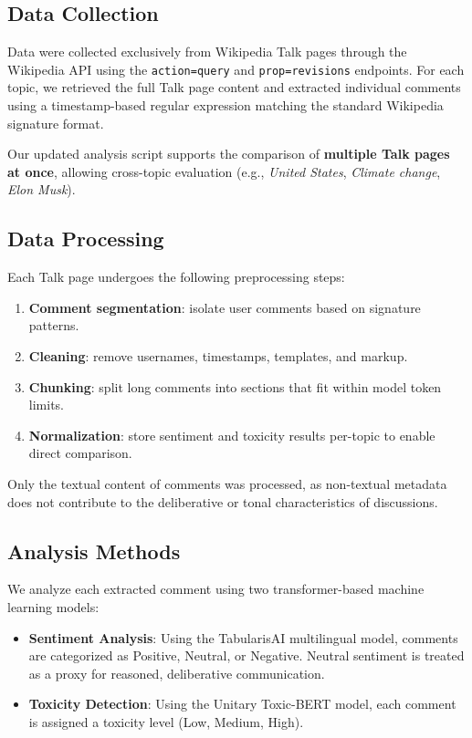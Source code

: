 \subsection{Data Collection}

Data were collected exclusively from Wikipedia Talk pages through the Wikipedia API using the 
\texttt{action=query} and \texttt{prop=revisions} endpoints. For each topic, we retrieved the 
full Talk page content and extracted individual comments using a timestamp-based regular 
expression matching the standard Wikipedia signature format.

Our updated analysis script supports the comparison of \textbf{multiple Talk pages at once}, 
allowing cross-topic evaluation (e.g., \textit{United States}, \textit{Climate change}, 
\textit{Elon Musk}).

\subsection{Data Processing}

Each Talk page undergoes the following preprocessing steps:

\begin{enumerate}
    \item \textbf{Comment segmentation}: isolate user comments based on signature patterns.
    \item \textbf{Cleaning}: remove usernames, timestamps, templates, and markup.
    \item \textbf{Chunking}: split long comments into sections that fit within model token limits.
    \item \textbf{Normalization}: store sentiment and toxicity results per-topic to enable direct comparison.
\end{enumerate}

Only the textual content of comments was processed, as non-textual metadata does not contribute 
to the deliberative or tonal characteristics of discussions.

\subsection{Analysis Methods}

We analyze each extracted comment using two transformer-based machine learning models:

\begin{itemize}
    \item \textbf{Sentiment Analysis}: Using the TabularisAI multilingual model, comments are categorized 
    as Positive, Neutral, or Negative. Neutral sentiment is treated as a proxy for reasoned, 
    deliberative communication.
    \item \textbf{Toxicity Detection}: Using the Unitary Toxic-BERT model, each comment is assigned a 
    toxicity level (Low, Medium, High).
\end{itemize}

